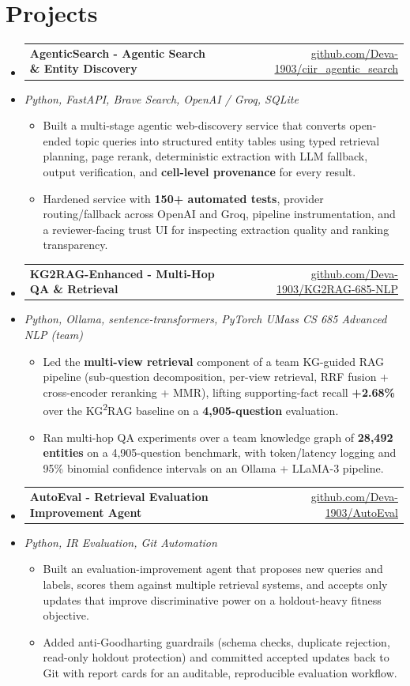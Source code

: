 \documentclass[letterpaper,10pt]{article}
\makeatletter
\newcommand{\resumeItem}[1]{
  \item\small{#1\vspace{-1pt}}
}
\newcommand{\resumeProjectHeading}[2]{
    \item
    \begin{tabular*}{0.985\textwidth}[t]{l@{\extracolsep{\fill}}r}
      \small\textbf{#1} & \small #2 \\
    \end{tabular*}\vspace{-5pt}
}
\newcommand{\resumeProjectSubheading}[1]{
  \vspace{-2pt}\item[] {\small\textcolor{ResumeSlate}{\emph{#1}}}\vspace{-3pt}
}
\newcommand{\resumeSubHeadingListStart}{\begin{itemize}[leftmargin=0.0in, label={}, itemsep=2pt, topsep=2pt]}
\newcommand{\resumeSubHeadingListEnd}{\end{itemize}}
\newcommand{\resumeItemListStart}{\begin{itemize}[leftmargin=0.18in, itemsep=2pt, topsep=1pt]}
\newcommand{\resumeItemListEnd}{\end{itemize}\vspace{-4pt}}
\makeatother
\begin{document}
\section{Projects}
\resumeSubHeadingListStart
  \resumeProjectHeading
    {AgenticSearch - Agentic Search \& Entity Discovery}
    {\href{https://github.com/Deva-1903/ciir_agentic_search}{github.com/Deva-1903/ciir\_agentic\_search}}
  \resumeProjectSubheading{Python, FastAPI, Brave Search, OpenAI / Groq, SQLite}
    \resumeItemListStart
      \resumeItem{Built a multi-stage agentic web-discovery service that converts open-ended topic queries into structured entity tables using typed retrieval planning, page rerank, deterministic extraction with LLM fallback, output verification, and \textbf{cell-level provenance} for every result.}
      \resumeItem{Hardened service with \textbf{150+ automated tests}, provider routing/fallback across OpenAI and Groq, pipeline instrumentation, and a reviewer-facing trust UI for inspecting extraction quality and ranking transparency.}
    \resumeItemListEnd
  \resumeProjectHeading
    {KG2RAG-Enhanced - Multi-Hop QA \& Retrieval}
    {\href{https://github.com/Deva-1903/KG2RAG-685-NLP}{github.com/Deva-1903/KG2RAG-685-NLP}}
  \resumeProjectSubheading{Python, Ollama, sentence-transformers, PyTorch \enspace\textbar\enspace UMass CS 685 Advanced NLP (team)}
    \resumeItemListStart
      \resumeItem{Led the \textbf{multi-view retrieval} component of a team KG-guided RAG pipeline (sub-question decomposition, per-view retrieval, RRF fusion + cross-encoder reranking + MMR), lifting supporting-fact recall \textbf{+2.68\%} over the KG\textsuperscript{2}RAG baseline on a \textbf{4,905-question} evaluation.}
      \resumeItem{Ran multi-hop QA experiments over a team knowledge graph of \textbf{28,492 entities} on a 4,905-question benchmark, with token/latency logging and 95\% binomial confidence intervals on an Ollama + LLaMA-3 pipeline.}
    \resumeItemListEnd
  \resumeProjectHeading
    {AutoEval - Retrieval Evaluation Improvement Agent}
    {\href{https://github.com/Deva-1903/AutoEval}{github.com/Deva-1903/AutoEval}}
  \resumeProjectSubheading{Python, IR Evaluation, Git Automation}
    \resumeItemListStart
      \resumeItem{Built an evaluation-improvement agent that proposes new queries and labels, scores them against multiple retrieval systems, and accepts only updates that improve discriminative power on a holdout-heavy fitness objective.}
      \resumeItem{Added anti-Goodharting guardrails (schema checks, duplicate rejection, read-only holdout protection) and committed accepted updates back to Git with report cards for an auditable, reproducible evaluation workflow.}
    \resumeItemListEnd
\resumeSubHeadingListEnd
\vspace{-4pt}
\end{document}
